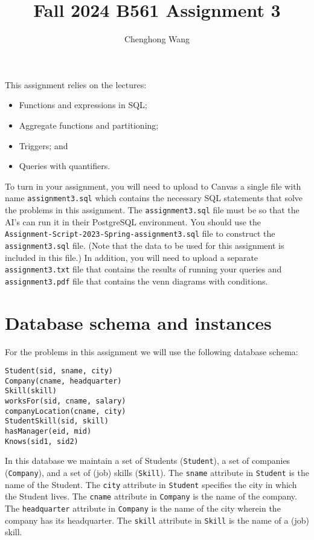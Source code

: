 \documentclass{article}
\begin{document}
\title{Fall 2024 B561 Assignment 3 \\
}
\author{Chenghong Wang}
\maketitle

This assignment relies on the lectures:
\begin{itemize}
\item Functions and expressions in SQL;
\item Aggregate functions and partitioning; 
\item Triggers; and
\item Queries with quantifiers.
\end{itemize}

To turn in your assignment, you will need to upload to Canvas a single file
with name \texttt{assignment3.sql} which contains the necessary SQL statements
that solve the problems in this assignment. The \texttt{assignment3.sql} file must
be so that the AI's can run it in their PostgreSQL environment. You should
use the \texttt{Assignment-Script-2023-Spring-assignment3.sql} file to construct
the \texttt{assignment3.sql} file. (Note that the data to be used for this assignment
is included in this file.) In addition, you will need to upload a separate
\texttt{assignment3.txt} file that contains the results of running your queries and 
\texttt{assignment3.pdf} file that contains the venn diagrams with conditions.


\newpage
\section{Database schema and instances}

For the problems in this assignment we will use the following database schema:
\begin{center}
\texttt{Student(sid, sname, city)}\\
\texttt{Company(cname, headquarter)}\\
\texttt{Skill(skill)}\\
\texttt{worksFor(sid, cname, salary)}\\
\texttt{companyLocation(cname, city)}\\
\texttt{StudentSkill(sid, skill)}\\
\texttt{hasManager(eid, mid)}\\
\texttt{Knows(sid1, sid2)}
\end{center}

In this database we maintain a set of Students (\texttt{Student}), a set of companies (\texttt{Company}), and a set of (job) skills (\texttt{Skill}). The \texttt{sname} attribute in \texttt{Student} is the name of the Student. The \texttt{city} attribute in \texttt{Student} specifies the city in which the Student lives. The \texttt{cname} attribute in \texttt{Company} is the name of the company. The \texttt{headquarter} attribute in \texttt{Company} is the name of the city wherein the company has its headquarter. The \texttt{skill} attribute in \texttt{Skill} is the name of a (job) skill.
\end{document}
